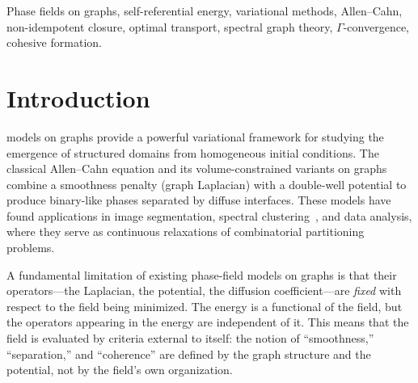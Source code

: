 \documentclass[lettersize,journal]{IEEEtran}
\begin{document}
\begin{abstract}
families can be continuation-accessible and locally robust yet poorly accessible from raw multistart initialization, so no branch-free merge-barrier theorem is claimed. Structured spectral bounds (Theorem~\ref{thm:beyond-weyl}) refine coexistence estimates beyond generic Weyl control, but configuration-specific factors such as the previously reported $33\times$ improvement remain empirical rather than universal. Computational experiments on grids up to $50 \times 50$ and 32~graph families confirm the proved and supported parts of the theory.
\end{abstract}

\begin{IEEEkeywords}
Phase fields on graphs, self-referential energy, variational methods, Allen--Cahn, non-idempotent closure, optimal transport, spectral graph theory, $\Gamma$-convergence, cohesive formation.
\end{IEEEkeywords}

\section{Introduction}
\label{sec:intro}

 models on graphs provide a powerful variational framework for studying the emergence of structured domains from homogeneous initial conditions. The classical Allen--Cahn equation and its volume-constrained variants on graphs~\cite{vanGennip2012} combine a smoothness penalty (graph Laplacian) with a double-well potential to produce binary-like phases separated by diffuse interfaces. These models have found applications in image segmentation, spectral clustering~\cite{ShiMalik2000}, and data analysis, where they serve as continuous relaxations of combinatorial partitioning problems.

A fundamental limitation of existing phase-field models on graphs is that their operators---the Laplacian, the potential, the diffusion coefficient---are \emph{fixed} with respect to the field being minimized. The energy is a functional of the field, but the operators appearing in the energy are independent of it. This means that the field is evaluated by criteria external to itself: the notion of ``smoothness,'' ``separation,'' and ``coherence'' are defined by the graph structure and the potential, not by the field's own organization.
\end{document}
